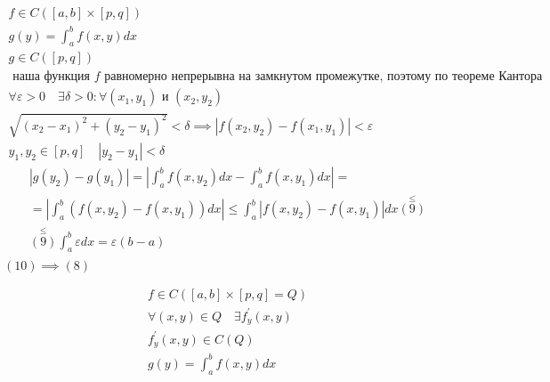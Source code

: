 \documentclass[main]{subfiles}
\begin{document}
     \begin{theorem}
          \begin{gather*}
               f \in C([a,b] \times [p,q]) \\ 
               g(y) = \int^b_a f(x,y) dx \tag{7} \\
               g \in C([p,q]) \tag{8} \\
               \text{ наша функция } f \text{ равномерно непрерывна на замкнутом промежутке, поэтому по теореме Кантора } \\
               \forall \varepsilon > 0 \quad \exists \delta > 0 : \forall (x_1,y_1) \text{ и } (x_2,y_2) \\
               \sqrt{(x_2-x_1)^2 + (y_2-y_1)^2} < \delta \implies |f(x_2,y_2) - f(x_1,y_1)  | < \varepsilon \tag{9} \\
               y_1,y_2 \in [p,q] \quad |y_2 - y_1| < \delta 
          \end{gather*}
          \begin{multline*}
               |g(y_2) - g(y_1)| = \left | \int^b_a f(x,y_2) dx - \int^b_a f(x,y_1)dx \right | = \\
               = \left | \int^b_a (f(x,y_2) - f(x,y_1))dx \right | \leq \int^b_a |f(x,y_2) - f(x,y_1)|dx \stackrel{\leq}{(9)} \\
               \stackrel{\leq}{(9)} \int^b_a \varepsilon dx = \varepsilon(b-a) \tag{10} \\
                  \end{multline*}
                  $(10) \implies (8) $
     \end{theorem}
     \begin{theorem}
          \begin{gather*}
               f \in C([a,b] \times [p,q] = Q) \\
               \forall (x,y) \in Q \quad \exists f^\prime_y(x,y) \\
               f^\prime_y(x,y) \in C(Q) \tag{11} \\
               g(y) = \int^b_a f(x,y) dx \\
          \end{gather*}
     \end{theorem}
\end{document}

